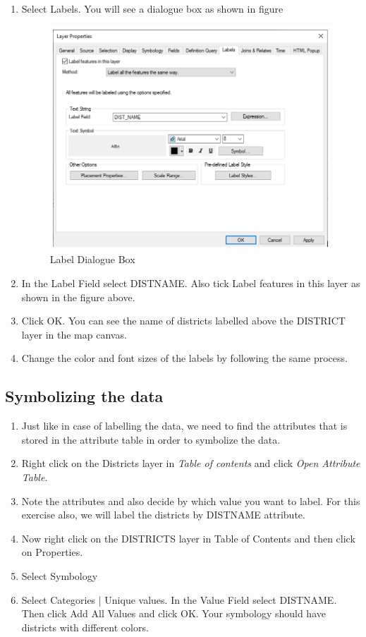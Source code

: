 \begin{enumerate}
\item{Select Labels. You will see a dialogue box as shown in figure}
	\begin{figure}
	\label{fig:Label Dialogue Box}
	\centering
	\includegraphics[scale=0.5]{images/label}
	\caption{Label Dialogue Box}
	\end{figure}
 
\item{In the Label Field select DIST\textunderscore NAME. Also tick Label features in this layer as shown in the figure above.}
\item{Click OK. You can see the name of districts labelled above the DISTRICT layer in the map canvas.}

 
\item{Change the color and font sizes of the labels by following the same process.} 

\end{enumerate}

\subsection{Symbolizing the data}
\begin{enumerate}
\item{Just like in case of labelling the data, we need to find the attributes that is stored in the attribute table in order to symbolize the data.}
\item{Right click on the Districts layer in \emph{Table of contents} and click \emph{Open Attribute Table}.}
\item{Note the attributes and also decide by which value you want to label. For this exercise also, we will label the districts by DIST\textunderscore NAME attribute.}
\item{Now right click on the DISTRICTS layer in Table of Contents and then click on Properties.}
\item{Select Symbology}
\item{Select Categories | Unique values. In the Value Field select DIST\textunderscore NAME. Then click Add All Values and click OK. Your symbology should have districts with different colors.}
\end{enumerate}

